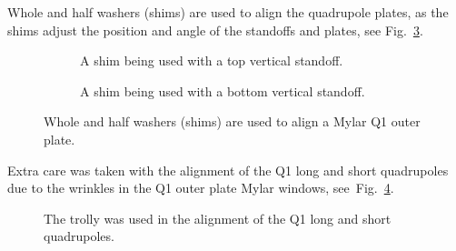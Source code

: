 Whole and half washers (shims) are used to align the quadrupole plates, as the shims adjust the position and angle of the standoffs and plates, see Fig.~\ref{fig:vert_stand_shims}. 
\begin{figure}[]
	\centering
	\begin{subfigure}{\columnwidth}
		\caption{A shim being used with a top vertical standoff.}\label{fig:vert_stand_shim_top}
	\end{subfigure}
	\begin{subfigure}{\columnwidth}
		\caption{A shim being used with a bottom vertical standoff.}\label{fig:vert_stand_shim_bot}
	\end{subfigure}
	\caption{Whole and half washers (shims) are used to align a Mylar Q1 outer plate.}\label{fig:vert_stand_shims}
\end{figure}

Extra care was taken with the alignment of the Q1 long and short quadrupoles due to the wrinkles in the Q1 outer plate Mylar windows, see~Fig.~\ref{fig:plate_align_trolley}.
\begin{figure}[]
	\centering
	\caption{The trolly was used in the alignment of the Q1 long and short quadrupoles.}\label{fig:plate_align_trolley}
\end{figure}

